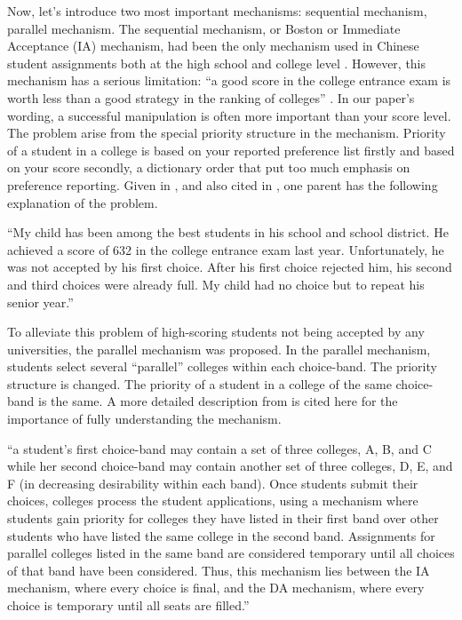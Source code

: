 Now, let's introduce two most important mechanisms: sequential mechanism, parallel mechanism. The sequential mechanism, or Boston or Immediate Acceptance (IA) mechanism,
had been the only mechanism used in Chinese student assignments both at the high school
and college level \parencite{Nie2007b}. However, this mechanism has a serious limitation: “a good score in
the college entrance exam is worth less than a good strategy in the ranking of colleges” \parencite{Nie2007a}. In our paper's wording, a successful manipulation is often more important than your score level. The problem arise from the special priority structure in the mechanism. Priority of a student in a college is based on your reported preference list firstly and based on your score secondly, a dictionary order that put too much emphasis on preference reporting. Given in \parencite{Nie2007b}, and also cited in \parencite{YanChenJPE}, one parent has the following explanation of the problem.

``My child has been among the best students in his school and school district. He
achieved a score of 632 in the college entrance exam last year. Unfortunately, he was
not accepted by his first choice. After his first choice rejected him, his second and third
choices were already full. My child had no choice but to repeat his senior year.''

To alleviate this problem of high-scoring students not being accepted by any universities, the
parallel mechanism was proposed. 
In the parallel mechanism, students select several
“parallel” colleges within each choice-band. The priority structure is changed. The priority of a student in a college of the same choice-band is the same. A more detailed description from \parencite{YanChenJPE} is cited here for the importance of fully understanding the mechanism.

``a student’s first choice-band may
contain a set of three colleges, A, B, and C while her second choice-band may contain another set
of three colleges, D, E, and F (in decreasing desirability within each band). Once students submit
their choices, colleges process the student applications, using a mechanism where students gain
priority for colleges they have listed in their first band over other students who have listed the same
college in the second band. Assignments for parallel colleges listed in the same band are considered
temporary until all choices of that band have been considered. Thus, this mechanism lies between
the IA mechanism, where every choice is final, and the DA mechanism, where every choice is
temporary until all seats are filled.''

